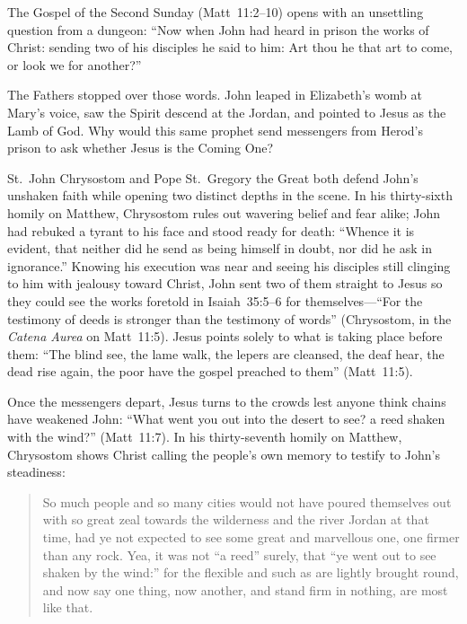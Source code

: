 The Gospel of the Second Sunday (Matt~11:2--10) opens with an unsettling
question from a dungeon: ``Now when John had heard in prison the works
of Christ: sending two of his disciples he said to him: Art thou he that
art to come, or look we for another?''

The Fathers stopped over those words. John leaped in Elizabeth's womb at
Mary's voice, saw the Spirit descend at the Jordan, and pointed to Jesus
as the Lamb of God. Why would this same prophet send messengers from
Herod's prison to ask whether Jesus is the Coming One?

St.~John Chrysostom and Pope St.~Gregory the Great both defend John's
unshaken faith while opening two distinct depths in the scene. In his
thirty-sixth homily on Matthew, Chrysostom rules out wavering belief and
fear alike; John had rebuked a tyrant to his face and stood ready for
death: ``Whence it is evident, that neither did he send as being himself
in doubt, nor did he ask in ignorance.'' Knowing his execution was near
and seeing his disciples still clinging to him with jealousy toward
Christ, John sent two of them straight to Jesus so they could see the
works foretold in Isaiah~35:5--6 for themselves---``For the testimony of
deeds is stronger than the testimony of words'' (Chrysostom, in the
\textit{Catena Aurea} on Matt~11:5). Jesus points solely to what is
taking place before them: ``The blind see, the lame walk, the lepers are
cleansed, the deaf hear, the dead rise again, the poor have the gospel
preached to them'' (Matt~11:5).

Once the messengers depart, Jesus turns to the crowds lest anyone think
chains have weakened John: ``What went you out into the desert to see? a
reed shaken with the wind?'' (Matt~11:7). In his thirty-seventh homily
on Matthew, Chrysostom shows Christ calling the people's own memory to
testify to John's steadiness:

\begin{quote}
So much people and so many cities would not have poured themselves out
with so great zeal towards the wilderness and the river Jordan at that
time, had ye not expected to see some great and marvellous one, one
firmer than any rock. Yea, it was not ``a reed'' surely, that ``ye went out
to see shaken by the wind:'' for the flexible and such as are lightly
brought round, and now say one thing, now another, and stand firm in
nothing, are most like that.
\end{quote}

